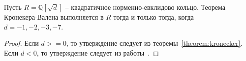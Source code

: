 \documentclass[_00_dissertation.tex]{subfiles}
\begin{document}
\begin{corollary}
    Пусть $R = \mathbb{Q}[\sqrt{d}]$ -- квадратичное норменно-евклидово кольцо.
    Теорема Кронекера-Валена выполняется в $R$ тогда и только тогда, когда $d=-1, -2, -3, -7$.
\end{corollary}
\begin{proof}
    Если $d>=0$, то утверждение следует из теоремы~\ref{theorem:kronecker}.
    Если $d<0$, то утверждение следует из работы~\cite{Rolletschek_1990}.
\end{proof}

\onlyinsubfile{
    
    
}
\end{document}
